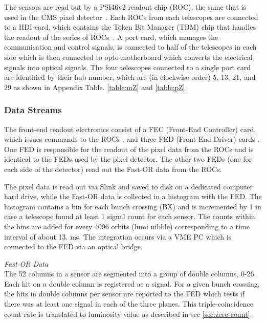 The sensors are read out by a PSI46v2 readout chip (ROC), the same that is used in the CMS pixel detector~\cite{Kastli:2005jj, ROCManual, Barbero:467141}. Each ROCs from each telescopes are connected to a HDI card, which contains the Token Bit Manager (TBM) chip that handles the readout of the series of ROCs~\cite{BartzTBM}. A port card, which manages the communication and control signals, is connected to half of the telescopes in each side which is then connected to opto-motherboard which converts the electrical signals into optical signals. The four telescopes connected to a single port card are identified by their hub number, which are (in clockwise order) 5, 13, 21, and 29 as shown in Appendix Table. \ref{table:mZ} and \ref{table:pZ}.






\subsubsection {Data Streams}

The front-end readout electronics consist of a FEC (Front-End Controller) card, which issues 
commands to the ROCs \cite{Allkofer:2007ek}, and three FED (Front-End Driver) cards \cite{Pernicka:1091743}. One FED is responsible for the readout of the pixel data from the ROCs and is identical to the FEDs used by the pixel detector. The other two FEDs (one for each side of the detector) read out the Fast-OR data from the ROCs. 

The pixel data \cite{Barbero:467141} is read out via Slink and saved to disk on a dedicated computer hard drive, while the Fast-OR data is collected in a histogram with the FED. The histogram contains a bin for each bunch crossing (BX) and is incremented by 1 in case a telescope found at least 1 signal count for each sensor. The counts within the bins are added for every 4096 orbits (lumi nibble) corresponding to a time interval of about 13. ms. The integration occurs via a VME PC which is connected to the FED via an optical bridge.



\noindent
\textit{Fast-OR Data} \\
The 52 columns in a sensor are segmented into a group of double columns, 0-26. Each hit on a double column is registered as a signal. For a given bunch crossing, the hits in double columns per sensor are reported to the FED which tests if there was at least one signal in each of the three planes. This triple-coincidence count rate is translated to luminosity value as described in sec \ref{sec:zero-count}.


